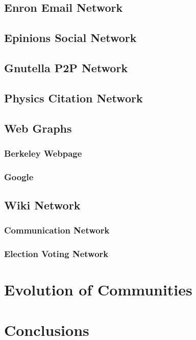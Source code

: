 \documentclass[phd,tocprelim]{cornell}
\begin{document}
\section{Enron Email Network}

\section{Epinions Social Network}

\section{Gnutella P2P Network}

\section{Physics Citation Network}

\section{Web Graphs}

\subsection{Berkeley Webpage}

\subsection{Google}


\section{Wiki Network}

\subsection{Communication Network}

\subsection{Election Voting Network}


\chapter{Evolution of Communities}


\chapter{Conclusions}
\end{document}
